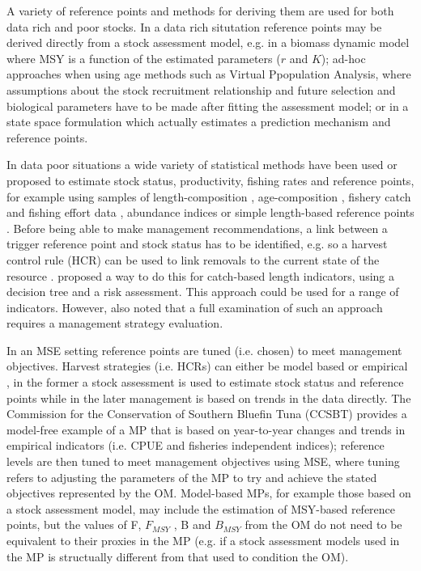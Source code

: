 \documentclass[a4paper, 10pt]{article}
\begin{document}
A variety of reference points and methods for deriving them are used for both data rich and poor stocks. In a data rich situtation reference points may be derived directly from a stock assessment model, e.g. in a biomass dynamic model where MSY is a function of the estimated parameters ($r$ and $K$); ad-hoc approaches when using age methods such as Virtual Ppopulation Analysis, where assumptions about the stock recruitment relationship and future selection and biological parameters have to be made after fitting the assessment model; or in a state space formulation \citep{nielsen2014estimation} which actually estimates a prediction mechanism and reference points. 

In data poor situations a wide variety of statistical methods have been used or proposed to estimate stock status, productivity, fishing rates and reference points, for example using samples of length-composition  \citep{kokkalis2015limits,prince2015length}, age-composition  \citep{thorson2015catch}, fishery catch and fishing effort data  \citep{roa2015hierarchical}, abundance indices  \citep{needle2015using} or simple length-based reference points  \citep{cope2009length}. Before  being able to make management recommendations, a link between a trigger reference point and stock status has to be identified, e.g. so a harvest control rule (HCR) can be used to link removals to the current state of the resource  \citep{restrepo1999precautionary}. \cite{cope2009length} proposed a way to do this for catch-based length indicators, using a decision tree and a risk assessment. This approach could be used for a range of indicators. However, \citep{cope2009length} also noted that a full examination of such an approach requires a management strategy evaluation.  

In an MSE setting reference points are tuned (i.e. chosen) to meet management objectives. Harvest strategies (i.e. HCRs) can either be model based or empirical \cite{dowling2015empirical}, in the former a stock assessment is used to estimate stock status and reference points while in the later management is based on trends in the data directly. The Commission for the Conservation of Southern Bluefin Tuna (CCSBT) provides a model-free example of a MP \citep{hillary2015scientific} that is based on year-to-year changes and trends in empirical indicators (i.e. CPUE and fisheries independent indices); reference levels are then tuned to meet management objectives using MSE, where tuning refers to adjusting the parameters of the MP to try and achieve the stated objectives represented by the OM. Model-based MPs, for example those based on a stock assessment model, may include the estimation of MSY-based reference points, but the values of F, $F_{MSY}$ , B and $B_{MSY}$ from the OM do not need to be equivalent to their proxies in the MP (e.g. if a stock assessment models used in the MP is structually different from that used to condition the OM).
\end{document}
